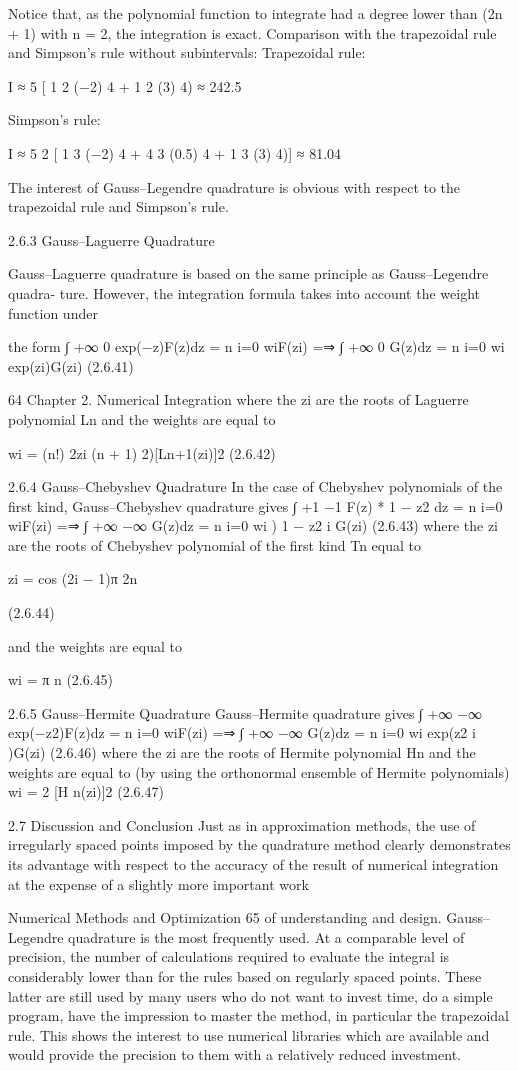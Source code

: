 \documentclass[letterpaper,12pt]{article}
\begin{document}
Notice that, as the polynomial function to integrate had a degree lower than (2n + 1) with n = 2, the
integration is exact.
Comparison with the trapezoidal rule and Simpson’s rule without subintervals:
Trapezoidal rule:

I ≈ 5 [
1
2
(−2)
4 + 1
2
(3)
4) ≈ 242.5

Simpson’s rule:

I ≈ 5
2 [
1
3
(−2)
4 + 4
3
(0.5)
4 + 1
3
(3)
4)] ≈ 81.04

The interest of Gauss–Legendre quadrature is obvious with respect to the trapezoidal rule and
Simpson’s rule.

2.6.3 Gauss–Laguerre Quadrature

Gauss–Laguerre quadrature is based on the same principle as Gauss–Legendre quadra-
ture. However, the integration formula takes into account the weight function under

the form
∫ +∞
0
exp(−z)F(z)dz =
n
i=0
wiF(zi) =⇒
∫ +∞
0
G(z)dz =
n
i=0
wi exp(zi)G(zi)
(2.6.41)

64 Chapter 2. Numerical Integration
where the zi are the roots of Laguerre polynomial Ln and the weights are equal to

wi = (n!)
2zi
(n + 1)
2)[Ln+1(zi)]2 (2.6.42)

2.6.4 Gauss–Chebyshev Quadrature
In the case of Chebyshev polynomials of the first kind, Gauss–Chebyshev quadrature
gives
∫ +1
−1
F(z)
*
1 − z2
dz =
n
i=0
wiF(zi) =⇒
∫ +∞
−∞
G(z)dz =
n
i=0
wi
)
1 − z2
i G(zi) (2.6.43)
where the zi are the roots of Chebyshev polynomial of the first kind Tn equal to

zi = cos 
(2i − 1)π
2n


(2.6.44)

and the weights are equal to

wi = π
n (2.6.45)

2.6.5 Gauss–Hermite Quadrature
Gauss–Hermite quadrature gives
∫ +∞
−∞
exp(−z2)F(z)dz =
n
i=0
wiF(zi) =⇒
∫ +∞
−∞
G(z)dz =
n
i=0
wi exp(z2
i )G(zi)
(2.6.46)
where the zi are the roots of Hermite polynomial Hn and the weights are equal to (by
using the orthonormal ensemble of Hermite polynomials)
wi = 2
[H
n(zi)]2 (2.6.47)

2.7 Discussion and Conclusion
Just as in approximation methods, the use of irregularly spaced points imposed by the
quadrature method clearly demonstrates its advantage with respect to the accuracy of
the result of numerical integration at the expense of a slightly more important work

Numerical Methods and Optimization 65
of understanding and design. Gauss–Legendre quadrature is the most frequently used.
At a comparable level of precision, the number of calculations required to evaluate
the integral is considerably lower than for the rules based on regularly spaced points.
These latter are still used by many users who do not want to invest time, do a simple
program, have the impression to master the method, in particular the trapezoidal rule.
This shows the interest to use numerical libraries which are available and would provide
the precision to them with a relatively reduced investment.
\end{document}
